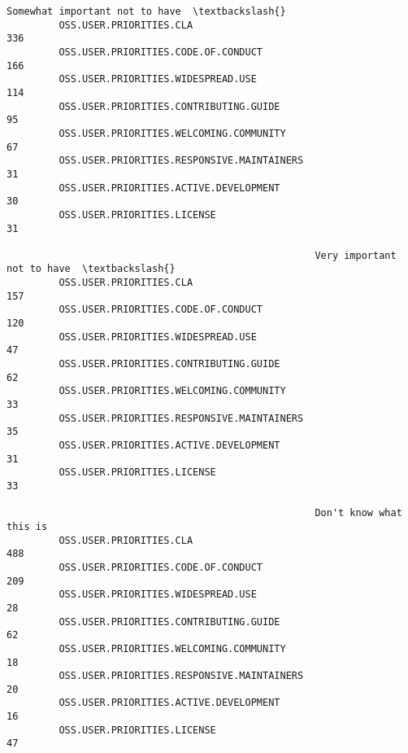 \documentclass[11pt]{article}
\begin{document}
\begin{Verbatim}[commandchars=\\\{\}]
                                                     Somewhat important not to have  \textbackslash{}
         OSS.USER.PRIORITIES.CLA                                                336   
         OSS.USER.PRIORITIES.CODE.OF.CONDUCT                                    166   
         OSS.USER.PRIORITIES.WIDESPREAD.USE                                     114   
         OSS.USER.PRIORITIES.CONTRIBUTING.GUIDE                                  95   
         OSS.USER.PRIORITIES.WELCOMING.COMMUNITY                                 67   
         OSS.USER.PRIORITIES.RESPONSIVE.MAINTAINERS                              31   
         OSS.USER.PRIORITIES.ACTIVE.DEVELOPMENT                                  30   
         OSS.USER.PRIORITIES.LICENSE                                             31   
         
                                                     Very important not to have  \textbackslash{}
         OSS.USER.PRIORITIES.CLA                                            157   
         OSS.USER.PRIORITIES.CODE.OF.CONDUCT                                120   
         OSS.USER.PRIORITIES.WIDESPREAD.USE                                  47   
         OSS.USER.PRIORITIES.CONTRIBUTING.GUIDE                              62   
         OSS.USER.PRIORITIES.WELCOMING.COMMUNITY                             33   
         OSS.USER.PRIORITIES.RESPONSIVE.MAINTAINERS                          35   
         OSS.USER.PRIORITIES.ACTIVE.DEVELOPMENT                              31   
         OSS.USER.PRIORITIES.LICENSE                                         33   
         
                                                     Don't know what this is  
         OSS.USER.PRIORITIES.CLA                                         488  
         OSS.USER.PRIORITIES.CODE.OF.CONDUCT                             209  
         OSS.USER.PRIORITIES.WIDESPREAD.USE                               28  
         OSS.USER.PRIORITIES.CONTRIBUTING.GUIDE                           62  
         OSS.USER.PRIORITIES.WELCOMING.COMMUNITY                          18  
         OSS.USER.PRIORITIES.RESPONSIVE.MAINTAINERS                       20  
         OSS.USER.PRIORITIES.ACTIVE.DEVELOPMENT                           16  
         OSS.USER.PRIORITIES.LICENSE                                      47  
\end{Verbatim}
        

    \begin{center}
    \end{center}
    { \hspace*{\fill} \\}
    
\end{document}
